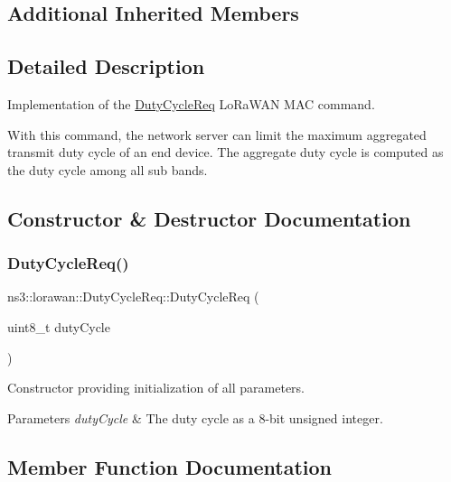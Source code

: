 \subsection*{Additional Inherited Members}


\subsection{Detailed Description}
Implementation of the \hyperlink{classns3_1_1lorawan_1_1DutyCycleReq}{Duty\+Cycle\+Req} Lo\+Ra\+W\+AN M\+AC command.

With this command, the network server can limit the maximum aggregated transmit duty cycle of an end device. The aggregate duty cycle is computed as the duty cycle among all sub bands. 

\subsection{Constructor \& Destructor Documentation}
\mbox{\label{classns3_1_1lorawan_1_1DutyCycleReq_aa940e6c73680a6eadfa976d08b56f92c}} 
\subsubsection{\texorpdfstring{Duty\+Cycle\+Req()}{DutyCycleReq()}}
{\footnotesize\ttfamily ns3\+::lorawan\+::\+Duty\+Cycle\+Req\+::\+Duty\+Cycle\+Req (\begin{DoxyParamCaption}\item[{uint8\+\_\+t}]{duty\+Cycle }\end{DoxyParamCaption})}

Constructor providing initialization of all parameters.


\begin{DoxyParams}{Parameters}
{\em duty\+Cycle} & The duty cycle as a 8-\/bit unsigned integer. \\
\hline
\end{DoxyParams}


\subsection{Member Function Documentation}
\mbox{\label{classns3_1_1lorawan_1_1DutyCycleReq_ac158ec7e1539555825e2651ee176c7a5}} 
